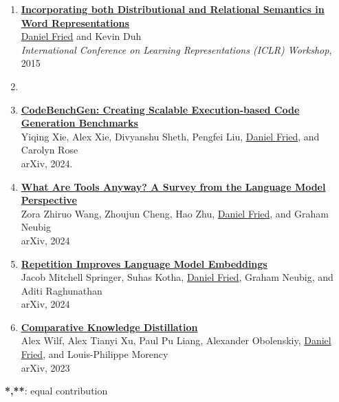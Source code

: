 \begin{enumerate}[leftmargin=-1mm,partopsep=0pt]
  \item \href{http://arxiv.org/abs/1412.5836}{\textbf{Incorporating both Distributional and Relational Semantics in Word Representations}}\\
    \underline{Daniel Fried} and Kevin Duh \\
    \emph{International Conference on Learning Representations (ICLR) Workshop}, 2015


  \item[]

  \item \href{https://arxiv.org/abs/2404.00566}{\textbf{CodeBenchGen: Creating Scalable Execution-based Code Generation Benchmarks}} \\
    Yiqing Xie, Alex Xie, Divyanshu Sheth, Pengfei Liu, \underline{Daniel Fried}, and Carolyn Rose \\
    arXiv, 2024.

  \item \href{http://arxiv.org/abs/2403.15452}{\textbf{What Are Tools Anyway? A Survey from the Language Model Perspective}}\\
    Zora Zhiruo Wang, Zhoujun Cheng, Hao Zhu, \underline{Daniel Fried}, and Graham Neubig \\
    arXiv, 2024

  \item \href{https://arxiv.org/abs/2402.15449}{\textbf{Repetition Improves Language Model Embeddings}}\\
    Jacob Mitchell Springer, Suhas Kotha, \underline{Daniel Fried}, Graham Neubig, and Aditi Raghunathan \\
    arXiv, 2024

  \item \href{https://arxiv.org/abs/2311.02253}{\textbf{Comparative Knowledge Distillation}} \\
    Alex Wilf, Alex Tianyi Xu, Paul Pu Liang, Alexander Obolenskiy, \underline{Daniel Fried}, and Louis-Philippe Morency \\
    arXiv, 2023

\end{enumerate}
\textbf{*,**}: equal contribution
